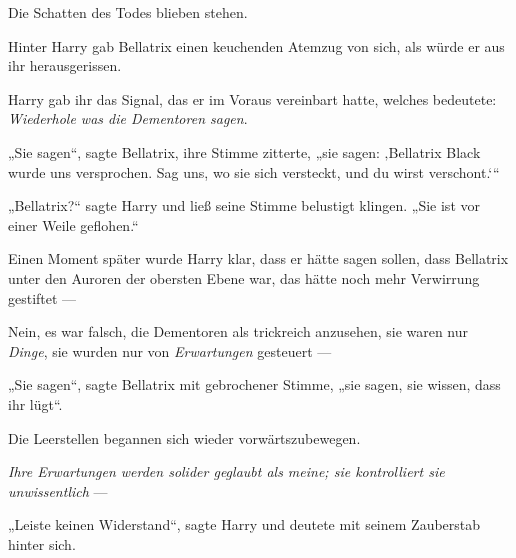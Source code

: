 Die Schatten des Todes blieben stehen.

Hinter Harry gab Bellatrix einen keuchenden Atemzug von sich, als würde er aus ihr herausgerissen.

Harry gab ihr das Signal, das er im Voraus vereinbart hatte, welches bedeutete: \emph{Wiederhole was die Dementoren sagen}.

„Sie sagen“, sagte Bellatrix, ihre Stimme zitterte, „sie sagen: ‚Bellatrix Black wurde uns versprochen. Sag uns, wo sie sich versteckt, und du wirst verschont.‘“

„Bellatrix?“ sagte Harry und ließ seine Stimme belustigt klingen.
„Sie ist vor einer Weile geflohen.“

Einen Moment später wurde Harry klar, dass er hätte sagen sollen, dass Bellatrix unter den Auroren der obersten Ebene war, das hätte noch mehr Verwirrung gestiftet —

Nein, es war falsch, die Dementoren als trickreich anzusehen, sie waren nur \emph{Dinge}, sie wurden nur von \emph{Erwartungen} gesteuert —

„Sie sagen“, sagte Bellatrix mit gebrochener Stimme, „sie sagen, sie wissen, dass ihr lügt“.

Die Leerstellen begannen sich wieder vorwärtszubewegen.

\emph{Ihre Erwartungen werden solider geglaubt als meine; sie kontrolliert sie unwissentlich} —

„Leiste keinen Widerstand“, sagte Harry und deutete mit seinem Zauberstab hinter sich.

